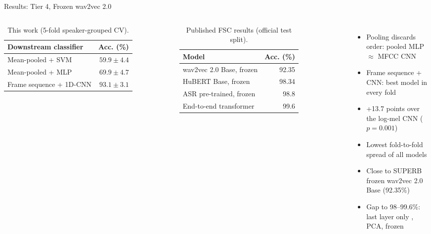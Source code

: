 \documentclass[aspectratio=169,10pt,xcolor=table]{beamer}
\begin{document}
\begin{frame}{Results: Tier 4, Frozen wav2vec 2.0}
\begin{columns}[T]
\scriptsize
\begin{table}
\caption{This work (5-fold speaker-grouped CV).}
\begin{tabular}{@{}lr@{}}
\toprule
Downstream classifier & Acc. (\%)\\
\midrule
Mean-pooled + SVM & $59.9 \pm 4.4$\\
Mean-pooled + MLP & $69.9 \pm 4.7$\\
Frame sequence + 1D-CNN & $\mathbf{93.1 \pm 3.1}$\\
\bottomrule
\end{tabular}
\end{table}
\vspace{-4pt}
\begin{table}
\caption{Published FSC results (official test split).}
\begin{tabular}{@{}lr@{}}
\toprule
Model & Acc. (\%)\\
\midrule
wav2vec 2.0 Base, frozen \cite{yang2021superb} & 92.35\\
HuBERT Base, frozen \cite{yang2021superb} & 98.34\\
ASR pre-trained, frozen \cite{lugosch2019fsc} & 98.8\\
End-to-end transformer \cite{radfar2020transformer} & 99.6\\
\bottomrule
\end{tabular}
\end{table}
\vspace{0.3cm}
\small
\begin{itemize}\setlength{\itemsep}{7pt}
\item Pooling discards order: pooled MLP $\approx$ MFCC CNN
\item Frame sequence + CNN: best model in every fold
\item +13.7 points over the log-mel CNN ($p = 0.001$)
\item Lowest fold-to-fold spread of all models
\item Close to SUPERB frozen wav2vec 2.0 Base (92.35\%)
\item Gap to 98--99.6\%: last layer only \cite{pasad2021layerwise}, PCA, frozen
\end{itemize}
\end{columns}
\end{frame}
\end{document}
